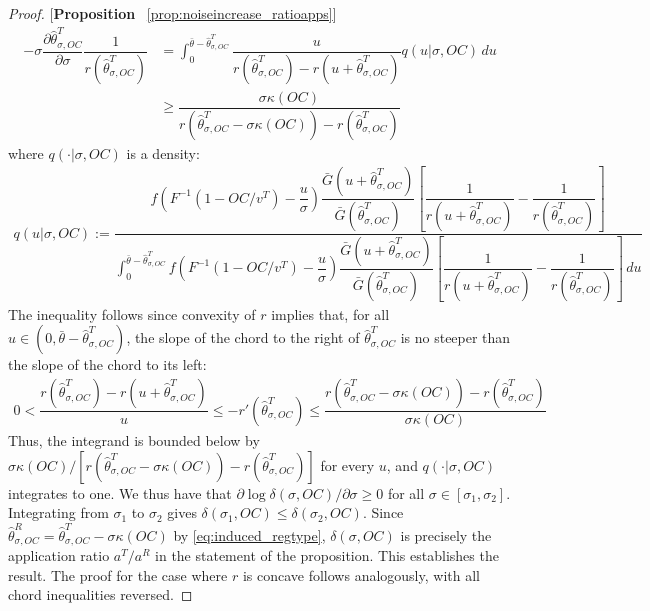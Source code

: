 \begin{proof}{[\textbf{Proposition} ~\ref{prop:noiseincrease_ratioapps}]}
\begin{align*}
    -\sigma \dfrac{\partial \hat{\theta}^T_{\sigma,OC}}{\partial \sigma}\dfrac{1}{r(\hat{\theta}^T_{\sigma,OC})} &= \int_{0}^{\bar{\theta}-\hat{\theta}^T_{\sigma,OC}}\dfrac{u}{r(\hat{\theta}^T_{\sigma,OC})-r(u+\hat{\theta}^T_{\sigma,OC})} q(u|\sigma,OC)\,du \\
    &\geq \dfrac{\sigma \kappa(OC)}{r(\hat{\theta}^T_{\sigma,OC}-\sigma \kappa(OC))-r(\hat{\theta}^T_{\sigma,OC})}
\end{align*}
where $q(\cdot|\sigma,OC)$ is a density:
\begin{align*}
    q(u|\sigma,OC) := \dfrac{f\left(F^{-1}(1-OC/v^T)-\dfrac{u}{\sigma}\right)\dfrac{\bar{G}(u+\hat{\theta}^T_{\sigma,OC})}{\bar{G}(\hat{\theta}^T_{\sigma,OC})}\left[\dfrac{1}{r(u+\hat{\theta}^T_{\sigma,OC})} - \dfrac{1}{r(\hat{\theta}^T_{\sigma,OC})}\right]}{\int_{0}^{\bar{\theta} - \hat{\theta}^T_{\sigma,OC}} f\left(F^{-1}(1-OC/v^T)-\dfrac{u}{\sigma}\right)\dfrac{\bar{G}(u+\hat{\theta}^T_{\sigma,OC})}{\bar{G}(\hat{\theta}^T_{\sigma,OC})}\left[\dfrac{1}{r(u+\hat{\theta}^T_{\sigma,OC})} - \dfrac{1}{r(\hat{\theta}^T_{\sigma,OC})}\right]\,du}
\end{align*}
The inequality follows since convexity of $r$ implies that, for all $u\in(0,\bar{\theta}-\hat{\theta}^T_{\sigma,OC})$, the slope of the chord to the right of $\hat{\theta}^T_{\sigma,OC}$ is no steeper than the slope of the chord to its left:
\begin{align*}
    0< \dfrac{r(\hat{\theta}^T_{\sigma,OC})-r(u+\hat{\theta}^T_{\sigma,OC})}{u} \leq -r'(\hat{\theta}^T_{\sigma,OC}) \leq \dfrac{r(\hat{\theta}^T_{\sigma,OC}-\sigma \kappa(OC))-r(\hat{\theta}^T_{\sigma,OC})}{\sigma\kappa(OC)}
\end{align*}
Thus, the integrand is bounded below by $\sigma\kappa(OC)/[r(\hat{\theta}^T_{\sigma,OC}-\sigma \kappa(OC))-r(\hat{\theta}^T_{\sigma,OC})]$ for every $u$, and $q(\cdot|\sigma,OC)$ integrates to one. We thus have that $\partial \log \delta(\sigma,OC)/\partial \sigma \geq 0$ for all $\sigma\in[\sigma_1,\sigma_2]$. Integrating from $\sigma_1$ to $\sigma_2$ gives $\delta(\sigma_1,OC)\leq \delta(\sigma_2,OC)$. Since $\hat{\theta}^R_{\sigma,OC} = \hat{\theta}^T_{\sigma,OC}-\sigma\kappa(OC)$ by \eqref{eq:induced_regtype}, $\delta(\sigma,OC)$ is precisely the application ratio $a^T/a^R$ in the statement of the proposition. This establishes the result. The proof for the case where $r$ is concave follows analogously, with all chord inequalities reversed.
\end{proof}

